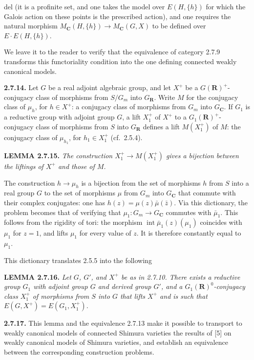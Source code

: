 \documentclass[10pt,a4paper]{article}
\newcommand{\SourcePage}[2]{\clearpage\setcounter{page}{#2}\typeout{D031_SOURCE_PAGE physical=#1 printed=#2}}
\begin{document}
\SourcePage{42}{288}
del (it is a profinite set, and one takes the model over \(E(H,\{h\})\) for which the Galois action on these points is the prescribed action), and one requires the natural morphism \(M_{\mathbf C}(H,\{h\})\to M_{\mathbf C}(G,X)\) to be defined over \(E\cdot E(H,\{h\})\).

We leave it to the reader to verify that the equivalence of category 2.7.9 transforms this functoriality condition into the one defining connected weakly canonical models.

\textbf{2.7.14.} Let \(G\) be a real adjoint algebraic group, and let \(X^+\) be a \(G(\mathbf R)^+\)-conjugacy class of morphisms from \(S/G_m\) into \(G_{\mathbf R}\). Write \(M\) for the conjugacy class of \(\mu_h\), for \(h\in X^+\): a conjugacy class of morphisms from \(G_m\) into \(G_{\mathbf C}\). If \(G_1\) is a reductive group with adjoint group \(G\), a lift \(X_1^+\) of \(X^+\) to a \(G_1(\mathbf R)^+\)-conjugacy class of morphisms from \(S\) into \(G_{\mathbf R}\) defines a lift \(M(X_1^+)\) of \(M\): the conjugacy class of \(\mu_{h_1}\), for \(h_1\in X_1^+\) (cf.~2.5.4).

\textbf{LEMMA 2.7.15.} \emph{The construction \(X_1^+\to M(X_1^+)\) gives a bijection between the liftings of \(X^+\) and those of \(M\).}

The construction \(h\to\mu_h\) is a bijection from the set of morphisms \(h\) from \(S\) into a real group \(G\) to the set of morphisms \(\mu\) from \(G_m\) into \(G_{\mathbf C}\) that commute with their complex conjugates: one has \(h(z)=\mu(z)\bar\mu(\bar z)\). Via this dictionary, the problem becomes that of verifying that \(\mu_1:G_m\to G_{\mathbf C}\) commutes with \(\bar\mu_1\). This follows from the rigidity of tori: the morphism \(\operatorname{int}\bar\mu_1(z)(\mu_1)\) coincides with \(\mu_1\) for \(z=1\), and lifts \(\mu_1\) for every value of \(z\). It is therefore constantly equal to \(\mu_1\).

This dictionary translates 2.5.5 into the following

\textbf{LEMMA 2.7.16.} \emph{Let \(G\), \(G'\), and \(X^+\) be as in 2.7.10. There exists a reductive group \(G_1\) with adjoint group \(G\) and derived group \(G'\), and a \(G_1(\mathbf R)^0\)-conjugacy class \(X_1^+\) of morphisms from \(S\) into \(G\) that lifts \(X^+\) and is such that \(E(G,X^+)=E(G_1,X_1^+)\).}

\textbf{2.7.17.} This lemma and the equivalence 2.7.13 make it possible to transport to weakly canonical models of connected Shimura varieties the results of {[}5{]} on weakly canonical models of Shimura varieties, and establish an equivalence between the corresponding construction problems.
\end{document}
